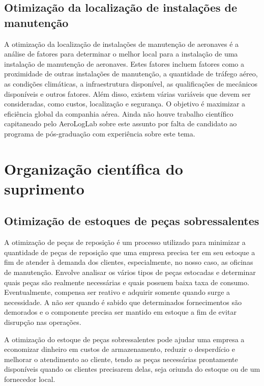 \documentclass{article}
\begin{document}
\subsection{Otimização da localização de instalações de manutenção}

A otimização da localização de instalações de manutenção de aeronaves é a análise de fatores para determinar o melhor local para a instalação de uma instalação de manutenção de aeronaves. Estes fatores incluem fatores como a proximidade de outras instalações de manutenção, a quantidade de tráfego aéreo, as condições climáticas, a infraestrutura disponível, as qualificações de mecânicos disponíveis e outros fatores. Além disso, existem várias variáveis que devem ser consideradas, como custos, localização e segurança.
O objetivo é maximizar a eficiência global da companhia aérea.
Ainda não houve trabalho científico capitaneado pelo AeroLogLab sobre este assunto por falta de candidato ao programa de pós-graduação com experiência sobre este tema.


\section{Organização científica do suprimento}


\subsection{Otimização de estoques de peças sobressalentes}

A otimização de peças de reposição é um processo utilizado para minimizar a quantidade de peças de reposição que uma empresa precisa ter em seu estoque a fim de atender à demanda dos clientes, especialmente, no nosso caso, as oficinas de manutenção. Envolve analisar os vários tipos de peças estocadas e determinar quais peças são realmente necessárias e quais possuem baixa taxa de consumo. Eventualmente, compensa ser reativo e adquirir somente quando surge a necessidade. A não ser quando é sabido que determinados fornecimentos são demorados e o componente precisa ser mantido em estoque a fim de evitar disrupção nas operações.

A otimização do estoque de peças sobressalentes pode ajudar uma empresa a economizar dinheiro em custos de armazenamento, reduzir o desperdício e melhorar o atendimento ao cliente, tendo as peças necessárias prontamente disponíveis quando os clientes precisarem delas, seja oriunda do estoque ou de um fornecedor local.
\end{document}
